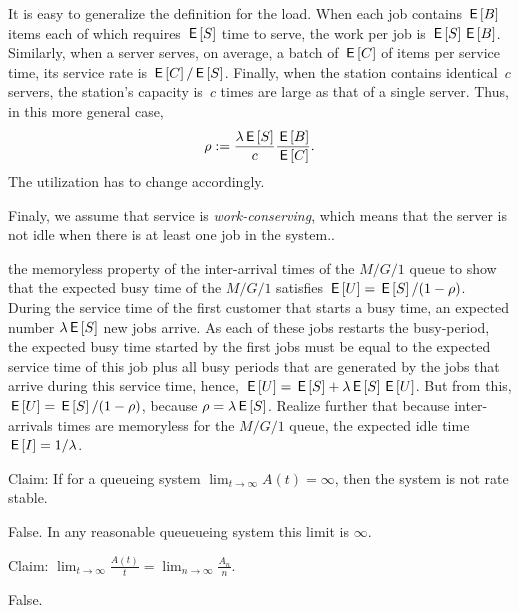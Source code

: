 \documentclass[stochastic-or.tex]{subfiles}
\begin{document}
It is  easy to generalize the definition for the load.
When each job contains $\,\mathsf{E}\left[B\right]$ items each of which requires $\,\mathsf{E}\left[S\right]$ time to serve, the work per job is $\,\mathsf{E}\left[S\right] \,\mathsf{E}\left[B\right]$.
Similarly, when a server serves, on average, a batch of $\,\mathsf{E}\left[C\right]$ of items per service time, its service rate is $\,\mathsf{E}\left[C\right]/\,\mathsf{E}\left[S\right]$.
Finally, when the station contains identical~$c$ servers, the station's capacity is~$c$ times are large as that of a single server.
Thus, in this more general case,
\begin{equation*}
\rho := \frac{\lambda \,\mathsf{E}\left[S\right]}c \frac{\,\mathsf{E}\left[B\right]}{\,\mathsf{E}\left[C\right]}.
\end{equation*}
The utilization has to change accordingly.

Finaly, we assume that service is \emph{work-conserving}, which means that the server is not idle when there is at least one job in the system..

 the memoryless property of the inter-arrival times of the $M/G/1$ queue to  show that the expected busy time of the $M/G/1$ satisfies $\,\mathsf{E}\left[U\right] = \,\mathsf{E}\left[S\right]/(1-\rho)$.
During the service time of the first customer that starts a busy time, an expected number $\lambda \,\mathsf{E}\left[S\right]$ new jobs arrive.
As each of these jobs restarts the busy-period, the expected busy time started by the first jobs must be equal to the expected service time of this job plus all busy periods that are generated by the jobs that arrive during this service time, hence, $\,\mathsf{E}\left[U\right] = \,\mathsf{E}\left[S\right] + \lambda \,\mathsf{E}\left[S\right] \,\mathsf{E}\left[U\right]$. But from this, $\,\mathsf{E}\left[U\right] = \,\mathsf{E}\left[S\right] / (1-\rho)$, because $\rho = \lambda \,\mathsf{E}\left[S\right]$.
Realize further that because inter-arrivals times are memoryless for the $M/G/1$ queue, the expected idle time $\,\mathsf{E}\left[I\right] = 1/\lambda$.

\begin{truefalse}
    Claim: If for a queueing system $\lim_{t\to\infty}A(t) = \infty$, then the system is not rate stable.
\begin{solution}
        False. In any reasonable queueueing system this limit is $\infty$.
\end{solution}
\end{truefalse}

\begin{truefalse}
    Claim:  $\lim_{t\to\infty}\frac{A(t)}{t}=\lim_{n\to\infty}\frac{A_n}{n}$.
\begin{solution}
        False.
\end{solution}
\end{truefalse}
\end{document}
